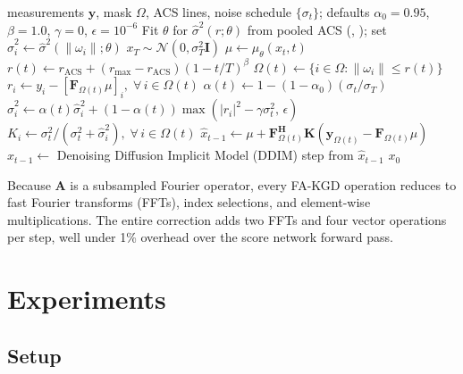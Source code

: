 \documentclass[10pt,twocolumn,letterpaper]{article}
\newcommand{\hatsig}{\hat{\sigma}}
\newcommand{\muth}{\mu_\theta}
\begin{document}
\begin{algorithm}[t]
\caption{FA-KGD with FPDC}
\label{alg:fakgd}
\begin{algorithmic}[1]
\REQUIRE measurements $\mathbf{y}$, mask $\Omega$, ACS lines,
         noise schedule $\{\sigma_t\}$; defaults $\alpha_0{=}0.95$,
         $\beta{=}1.0$, $\gamma{=}0$, $\epsilon{=}10^{-6}$
\STATE Fit $\theta$ for $\hatsig^2(r;\theta)$ from pooled ACS
         (, ); set
         $\hatsig_i^2\!\leftarrow\!\hatsig^2(\|\omega_i\|;\theta)$
\STATE $x_T \sim \mathcal{N}(0, \sigma_T^2\mathbf{I})$
  \STATE $\mu \leftarrow \muth(x_t, t)$ \hfill{}
  \STATE $r(t) \leftarrow r_{\text{ACS}} + (r_{\max}{-}r_{\text{ACS}})
         (1{-}t/T)^\beta$ \hfill{}
  \STATE $\Omega(t) \leftarrow \{i \in \Omega : \|\omega_i\| \leq r(t)\}$
  \STATE $r_i \leftarrow y_i - [\mathbf{F}_{\Omega(t)}\mu]_i,
         \;\forall\, i \in \Omega(t)$
  \STATE $\alpha(t) \leftarrow 1 - (1{-}\alpha_0)(\sigma_t/\sigma_T)$
  \STATE $\hatsig_i^2 \leftarrow \alpha(t)\hatsig_i^2 +
         (1{-}\alpha(t))\max(|r_i|^2 {-} \gamma\sigma_t^2,\,\epsilon)$
         \hfill{}
  \STATE $K_i \leftarrow \sigma_t^2/(\sigma_t^2 + \hatsig_i^2),
         \;\forall\, i \in \Omega(t)$
  \STATE $\hat{x}_{t-1} \leftarrow \mu +
         \mathbf{F}_{\Omega(t)}^\mathbf{H}\mathbf{K}
         (\mathbf{y}_{\Omega(t)} - \mathbf{F}_{\Omega(t)}\mu)$
         \hfill{}
  \STATE $x_{t-1} \leftarrow$ Denoising Diffusion Implicit Model (DDIM) step from $\hat{x}_{t-1}$
\ENDFOR
\RETURN $x_0$
\end{algorithmic}
\end{algorithm}

Because $\mathbf{A}$ is a subsampled Fourier operator, every FA-KGD
operation reduces to fast Fourier transforms (FFTs), index selections, and
element-wise multiplications. The entire correction adds two FFTs and four
vector operations per step, well under 1\% overhead over the score
network forward pass.

\section{Experiments}
\label{sec:experiments}

\subsection{Setup}
\end{document}
